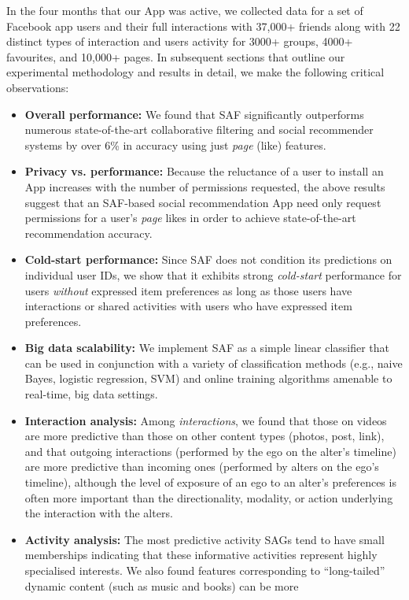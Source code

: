 In the four months that our App was active, we collected data for a
set of Facebook app users and their full interactions with 37,000+
friends along with 22 distinct types of interaction and users activity
for 3000+ groups, 4000+ favourites, and 10,000+ pages.  In subsequent
sections that outline our experimental methodology and results in
detail, we make the following critical observations:
\begin{itemize}
\item {\bf Overall performance:} We found that SAF significantly 
outperforms numerous state-of-the-art collaborative filtering and
social recommender systems by over 6\% in accuracy using
just \emph{page} (like) features.  
\item {\bf Privacy vs. performance:} 
Because the reluctance of a user to install an App increases with the
number of permissions requested, the above results suggest that an
SAF-based social recommendation App need only request permissions for
a user's \emph{page} likes in order to achieve state-of-the-art
recommendation accuracy.
\item {\bf Cold-start performance:}
Since SAF does not condition its predictions on individual
user IDs, we show that it exhibits strong \emph{cold-start}
performance for users \emph{without} expressed item preferences as long as those users
have interactions or shared activities with users who have
expressed item preferences.
\item {\bf Big data scalability:} We implement SAF as 
a simple linear classifier that
can be used in conjunction with a variety of classification methods (e.g., naive
Bayes, logistic regression, SVM) and online training algorithms
amenable to real-time, big data settings.
\item {\bf Interaction analysis:} 
Among \emph{interactions}, we found that those on videos are more
predictive than those on other content types (photos, post, link), and
that outgoing interactions (performed by the ego on the alter's
timeline) are more predictive than incoming ones (performed by alters
on the ego's timeline), although the level of exposure of an ego to an
alter's preferences is often more important than the directionality,
modality, or action underlying the interaction with the alters.
\item {\bf Activity analysis:}
The most predictive activity SAGs tend to have small memberships
indicating that these informative activities represent highly
specialised interests.  We also found features corresponding to
``long-tailed'' dynamic content (such as music and books) can be more

\end{itemize}
